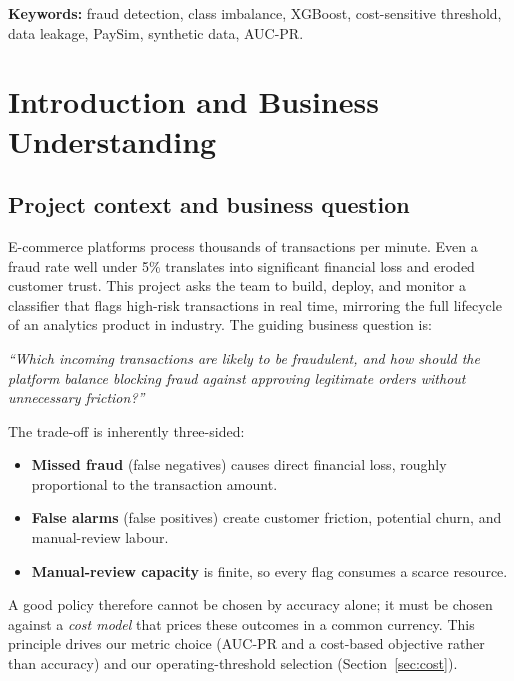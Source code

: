 \documentclass[11pt,a4paper]{report}
\begin{document}
\vspace{0.3cm}
\noindent\textbf{Keywords:} fraud detection, class imbalance, XGBoost, cost-sensitive
threshold, data leakage, PaySim, synthetic data, AUC-PR.

\tableofcontents
\thispagestyle{fancy}

\chapter{Introduction and Business Understanding}
\label{ch:intro}

\section{Project context and business question}

E-commerce platforms process thousands of transactions per minute. Even a fraud rate well
under 5\% translates into significant financial loss and eroded customer trust. This
project asks the team to build, deploy, and monitor a classifier that flags high-risk
transactions in real time, mirroring the full lifecycle of an analytics product in
industry. The guiding business question is:

\begin{keybox}
\textit{``Which incoming transactions are likely to be fraudulent, and how should the
platform balance blocking fraud against approving legitimate orders without unnecessary
friction?''}
\end{keybox}

The trade-off is inherently three-sided:
\begin{itemize}[nosep,leftmargin=1.4em]
  \item \textbf{Missed fraud} (false negatives) causes direct financial loss, roughly
        proportional to the transaction amount.
  \item \textbf{False alarms} (false positives) create customer friction, potential churn,
        and manual-review labour.
  \item \textbf{Manual-review capacity} is finite, so every flag consumes a scarce
        resource.
\end{itemize}

A good policy therefore cannot be chosen by accuracy alone; it must be chosen against a
\emph{cost model} that prices these outcomes in a common currency. This principle drives
our metric choice (AUC-PR and a cost-based objective rather than accuracy) and our
operating-threshold selection (Section~\ref{sec:cost}).
\end{document}
